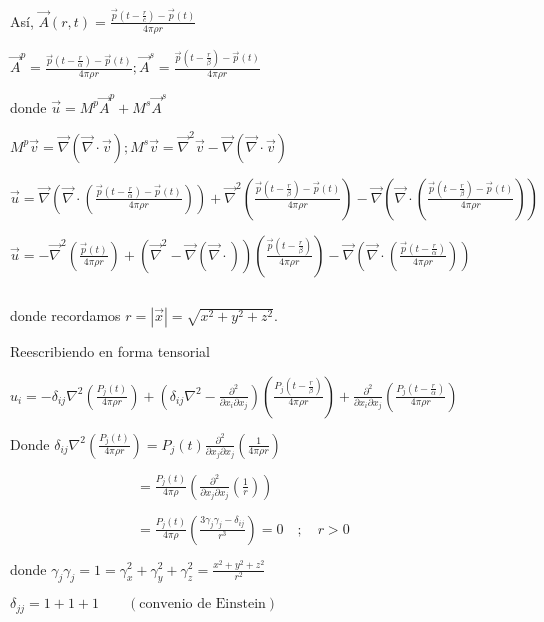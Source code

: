 \documentclass[a4paper,12pt]{article}
\begin{document}
Así, $\vec A(r,t)=\frac{\vec p\left(t-\frac{r}{c}\right)-\vec p (t)}{4\pi\rho r}$

$\vec A^p=\frac{\vec p\left(t-\frac{r}{\alpha}\right)-\vec p (t)}{4\pi\rho r};\vec A^s=\frac{\vec p\left(t-\frac{r}{\beta}\right)-\vec p (t)}{4\pi\rho r}$

donde $\vec u=M^p\vec A^p+M^s\vec A^s$

$M^p\vec v=\vec\nabla(\vec\nabla\cdot\vec v);M^s\vec v =\vec\nabla^2\vec v-\vec\nabla(\vec\nabla\cdot\vec v)$

$\vec u=\vec\nabla\left(\vec\nabla\cdot\left(\frac{\vec p\left(t-\frac{r}{\alpha}\right)-\vec p (t)}{4\pi\rho r} \right)\right) +\vec\nabla^2\left(\frac{\vec p \left(t-\frac{r}{\beta}\right)-\vec p (t)}{4\pi\rho r}\right)-\vec\nabla\left(\vec\nabla\cdot\left(\frac{\vec p\left(t-\frac{r}{\beta}\right)-\vec p (t)}{4\pi\rho r}\right)\right) $

$\vec u=-\vec\nabla^2\left(\frac{\vec p (t)}{4\pi\rho r}\right)+(\vec\nabla^2-\vec\nabla(\vec\nabla\cdot))\left(\frac{\vec p \left(t-\frac{r}{\beta}\right)}{4\pi\rho r}\right)-\vec\nabla\left(\vec\nabla\cdot\left(\frac{\vec p\left(t-\frac{r}{\alpha}\right)}{4\pi\rho r}\right)\right)$

$\quad$

donde recordamos $r=|\vec x|=\sqrt{x^2+y^2+z^2}$.
\begin{center}
Reescribiendo en forma tensorial
\end{center}

$u_i=-\delta_{ij}\nabla^2\left(\frac{P_j(t)}{4\pi\rho r}\right)+\left(\delta_{ij}\nabla^2-\frac{\partial^2}{\partial x_i\partial x_j}\right)\left(\frac{P_j\left(t- \frac{r}{\beta}\right)}{4\pi\rho r}\right)+\frac{\partial^2}{\partial x_i \partial x_j}\left(\frac{P_j\left(t-\frac{r}{\alpha}\right)}{4\pi\rho r}\right)$
$\quad$

Donde $\delta_{ij}\nabla^2\left(\frac{P_j (t)}{4\pi \rho r}\right)=P_j (t)\frac{\partial^2}{\partial x_j\partial x_j}\left(\frac{1}{4\pi\rho r}\right)$

$
\quad\quad\quad\quad\quad\quad\quad\quad\quad=\frac{P_j (t)}{4\pi\rho}\left(\frac{\partial^2}{\partial x_j\partial x_j}\left(\frac{1}{r}\right)\right)
$

$
\quad\quad\quad\quad\quad\quad\quad\quad\quad=\frac{P_j (t)}{4\pi\rho}\left(\frac{3\gamma_j\gamma_j-\delta_{ij}}{r^3}\right)=0\quad;\quad r > 0
$

\begin{center}
donde $\gamma_j\gamma_j=1=\gamma^2_x+\gamma^2_y+\gamma^2_z=\frac{x^2+y^2+z^2}{r^2}$

$\delta_{jj}=1+1+1\quad\quad(\text{convenio de Einstein})$
\end{center}
\end{document}
